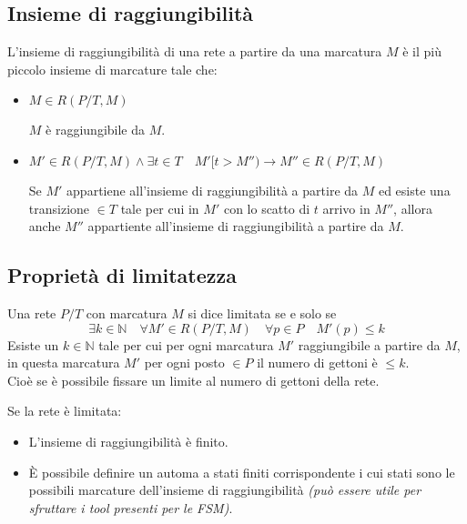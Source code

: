 \documentclass[12pt, twoside, letterpaper]{article}
\begin{document}
		\subsection{Insieme di raggiungibilità}
			L'insieme di raggiungibilità di una rete a partire da una marcatura $M$ è il più piccolo insieme di marcature tale che: 
			\begin{itemize}
				\item $M \in R(P/T, M)$
				
				\quad $M$ è raggiungibile da $M$.
				
				\item $M' \in R(P/T, M) \land \exists t \in T \quad M'[t> M'') \rightarrow M'' \in R(P/T, M)$

				\quad Se $M'$ appartiene all'insieme di raggiungibilità a partire da $M$ ed esiste una transizione $\in T$ tale per cui in $M'$ con lo scatto di $t$ arrivo in $M''$, allora anche $M''$ appartiente all'insieme di raggiungibilità a partire da $M$.
			\end{itemize}
			
		\subsection{Proprietà di limitatezza}
			Una rete $P/T$ con marcatura $M$ si dice limitata se e solo se $$\exists k \in \mathbb{N} \quad \forall M' \in R(P/T, M) \quad \forall p \in P \quad M'(p) \leq k$$ Esiste un $k \in \mathbb{N}$ tale per cui per ogni marcatura $M'$ raggiungibile a partire da $M$, in questa marcatura $M'$ per ogni posto $\in P$ il numero di gettoni è $\leq k$.\\
			Cioè se è possibile fissare un limite al numero di gettoni della rete.
			
			Se la rete è limitata: 
			\begin{itemize}
				\item L'insieme di raggiungibilità è finito.
				\item È possibile definire un automa a stati finiti corrispondente i cui stati sono le possibili marcature dell'insieme di raggiungibilità \textit{(può essere utile per sfruttare i tool presenti per le FSM)}.
			\end{itemize}
			
\end{document}
